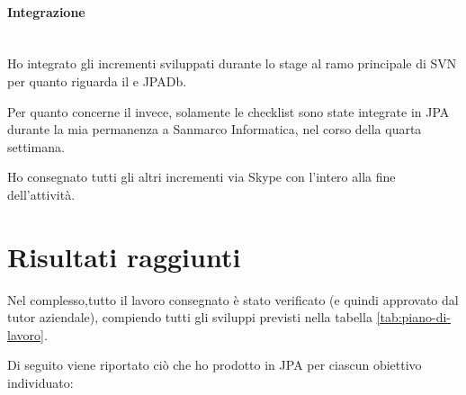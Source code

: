 \paragraph{Integrazione} \mbox{} \\

Ho integrato gli incrementi sviluppati durante lo stage al ramo principale di
SVN per quanto riguarda il \BKEND{} e JPADb.

Per quanto concerne il \FREND{} invece, solamente le checklist sono state
integrate in JPA durante la mia permanenza a Sanmarco Informatica, nel corso
della quarta settimana.

Ho consegnato tutti gli altri incrementi via Skype con l'intero
 alla fine dell'attività.

\section{Risultati raggiunti}\label{sec:stage-risultati}

Nel complesso,tutto il lavoro consegnato è stato verificato (e quindi
approvato dal tutor aziendale), compiendo tutti gli sviluppi previsti nella
tabella \ref{tab:piano-di-lavoro}.

Di seguito viene riportato ciò che ho prodotto in JPA per ciascun
obiettivo individuato:

